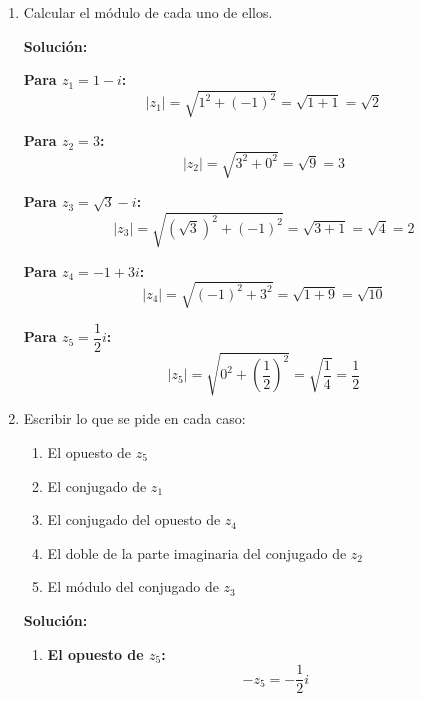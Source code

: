\documentclass[12pt]{article}
\newcommand{\solucion}{%
    \vspace{0.8em}%
    \textbf{Solución:}%
}
\begin{document}
\begin{enumerate}[label=\alph*.-]
\begin{center}
    \end{center}

    \newpage
    \item Calcular el módulo de cada uno de ellos.

    \solucion

    \textbf{Para $z_1 = 1 - i$:}
    \[
    |z_1| = \sqrt{1^2 + (-1)^2} = \sqrt{1 + 1} = \sqrt{2}
    \]

    \textbf{Para $z_2 = 3$:}
    \[
    |z_2| = \sqrt{3^2 + 0^2} = \sqrt{9} = 3
    \]

    \textbf{Para $z_3 = \sqrt{3} - i$:}
    \[
    |z_3| = \sqrt{(\sqrt{3})^2 + (-1)^2} = \sqrt{3 + 1} = \sqrt{4} = 2
    \]

    \textbf{Para $z_4 = -1 + 3i$:}
    \[
    |z_4| = \sqrt{(-1)^2 + 3^2} = \sqrt{1 + 9} = \sqrt{10}
    \]

    \textbf{Para $z_5 = \dfrac{1}{2}i$:}
    \[
    |z_5| = \sqrt{0^2 + \left(\dfrac{1}{2}\right)^2} = \sqrt{\dfrac{1}{4}} = \dfrac{1}{2}
    \]

    \item Escribir lo que se pide en cada caso:
    \begin{enumerate}[label=\roman*)]
        \item El opuesto de $z_5$
        \item El conjugado de $z_1$
        \item El conjugado del opuesto de $z_4$
        \item El doble de la parte imaginaria del conjugado de $z_2$
        \item El módulo del conjugado de $z_3$
    \end{enumerate}

    \solucion

    \begin{enumerate}[label=\roman*)]
        \item \textbf{El opuesto de $z_5$:}
        \[
        -z_5 = -\dfrac{1}{2}i
        \]


\end{enumerate}
\end{enumerate}
\end{document}
